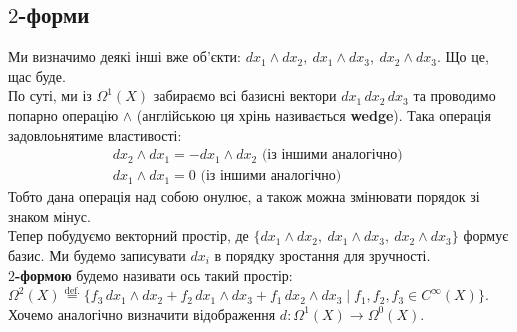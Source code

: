 \documentclass[a4paper, 10pt]{article}
\theoremstyle{theoremdd}
\theoremstyle{theoremdd}
\theoremstyle{theoremdd}
\theoremstyle{theoremdd}
\theoremstyle{theoremdd}
\theoremstyle{theoremdd}
\theoremstyle{theoremdd}
\theoremstyle{theoremdd}
\theoremstyle{theoremdd}
\begin{document}
\subsection{$2$-форми}
Ми визначимо деякі інші вже об'єкти: $dx_1 \wedge dx_2,\ dx_1 \wedge dx_3,\ dx_2 \wedge dx_3$. Що це, щас буде.\\
По суті, ми із $\Omega^1(X)$ забираємо всі базисні вектори $dx_1\,dx_2\,dx_3$ та проводимо попарно операцію $\wedge$ (англійською ця хрінь називається \textbf{wedge}). Така операція задовлоьнятиме властивості:
\begin{align*}
dx_2 \wedge dx_1 = -dx_1 \wedge dx_2 \text{ (із іншими аналогічно) } \\
dx_1 \wedge dx_1 = 0 \text{ (із іншими аналогічно) }
\end{align*}
Тобто дана операція над собою онулює, а також можна змінювати порядок зі знаком мінус.\\
Тепер побудуємо векторний простір, де $\{dx_1 \wedge dx_2,\ dx_1 \wedge dx_3,\ dx_2 \wedge dx_3\}$ формує базис. Ми будемо записувати $dx_i$ в порядку зростання для зручності.\\
\textbf{$2$-формою} будемо називати ось такий простір:\\
$\Omega^2(X) \overset{\text{def.}}{=} \{ f_3\, dx_1 \wedge dx_2 + f_2\, dx_1 \wedge dx_3 + f_1\, dx_2 \wedge dx_3 \mid f_1,f_2,f_3 \in C^\infty(X) \}$.
\bigskip \\
Хочемо аналогічно визначити відображення $d \colon \Omega^1(X) \to \Omega^0(X)$.
\end{document}
